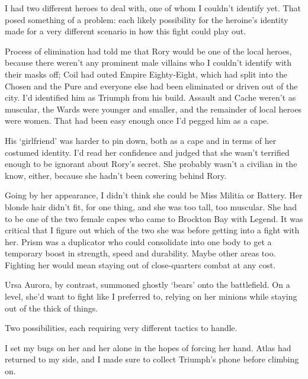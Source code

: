 





I had two different heroes to deal with, one of whom I couldn't identify yet.  That posed something of a problem: each likely possibility for the heroine's identity made for a very different scenario in how this fight could play out.



Process of elimination had told me that Rory would be one of the local heroes, because there weren't any prominent male villains who I couldn't identify with their masks off; Coil had outed Empire Eighty-Eight, which had split into the Chosen and the Pure and everyone else had been eliminated or driven out of the city.  I'd identified him as Triumph from his build.  Assault and Cache weren't as muscular, the Wards were younger and smaller, and the remainder of local heroes were women.  That had been easy enough once I'd pegged him as a cape.



His `girlfriend' was harder to pin down, both as a cape and in terms of her costumed identity.  I'd read her confidence and judged that she wasn't terrified enough to be ignorant about Rory's secret.  She probably wasn't a civilian in the know, either, because she hadn't been cowering behind Rory.



Going by her appearance, I didn't think she could be Miss Militia or Battery.  Her blonde hair didn't fit, for one thing, and she was too tall, too muscular.  She had to be one of the two female capes who came to Brockton Bay with Legend.  It was critical that I figure out which of the two she was before getting into a fight with her.  Prism was a duplicator who could consolidate into one body to get a temporary boost in strength, speed and durability.  Maybe other areas too.  Fighting her would mean staying out of close-quarters combat at any cost.



Ursa Aurora, by contrast, summoned ghostly `bears' onto the battlefield.  On a level, she'd want to fight like I preferred to, relying on her minions while staying out of the thick of things.



Two possibilities, each requiring very different tactics to handle.



I set my bugs on her and her alone in the hopes of forcing her hand.  Atlas had returned to my side, and I made sure to collect Triumph's phone before climbing on.



